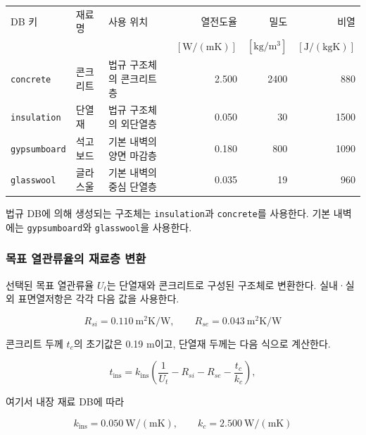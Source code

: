 \begin{defaulttable}
  \caption{\simulator 의 내장 기본 재료 DB}
  \label{tbl:default-materials}
  {\small
  \begin{tabular}{lllrrr}
    \toprule
    DB 키 & 재료명 & 사용 위치
      & 열전도율
      & 밀도
      & 비열 \\
    & & &
      $[\mathrm{W/(mK)}]$
      & $[\mathrm{kg/m^3}]$
      & $[\mathrm{J/(kgK)}]$ \\ \midrule
    \texttt{concrete}
      & 콘크리트
      & 법규 구조체의 콘크리트층
      & 2.500 & 2400 & 880 \\

    \texttt{insulation}
      & 단열재
      & 법규 구조체의 외단열층
      & 0.050 & 30 & 1500 \\

    \texttt{gypsumboard}
      & 석고보드
      & 기본 내벽의 양면 마감층
      & 0.180 & 800 & 1090 \\

    \texttt{glasswool}
      & 글라스울
      & 기본 내벽의 중심 단열층
      & 0.035 & 19 & 960 \\
    \bottomrule
  \end{tabular}
  }
\end{defaulttable}

법규 DB에 의해 생성되는 구조체는 \texttt{insulation}과 \texttt{concrete}를 사용한다. 기본 내벽에는 \texttt{gypsumboard}와 \texttt{glasswool}을 사용한다.

\subsubsection{목표 열관류율의 재료층 변환}

선택된 목표 열관류율 $U_t$는 단열재와 콘크리트로 구성된 구조체로 변환한다. 실내·실외 표면열저항은 각각 다음 값을 사용한다.

\[
  R_{si}=0.110\ \mathrm{m^2K/W},
  \qquad
  R_{se}=0.043\ \mathrm{m^2K/W}
\]

콘크리트 두께 $t_c$의 초기값은 0.19 m이고, 단열재 두께는 다음 식으로 계산한다.

\begin{equation}
  t_{\mathrm{ins}}
  =
  k_{\mathrm{ins}}
  \left(
    \frac{1}{U_t}
    -
    R_{si}
    -
    R_{se}
    -
    \frac{t_c}{k_c}
  \right),
  \label{eq:unknown-insulation-thickness}
\end{equation}

여기서 내장 재료 DB에 따라

\[
  k_{\mathrm{ins}}=0.050\ \mathrm{W/(mK)},
  \qquad
  k_c=2.500\ \mathrm{W/(mK)}
\]

